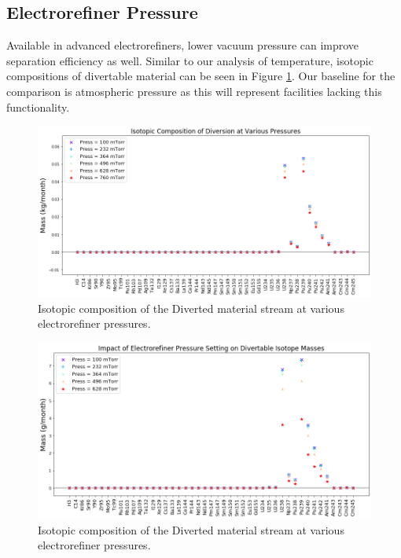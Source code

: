 \subsection{Electrorefiner Pressure}

Available in advanced electrorefiners, lower vacuum pressure can improve separation efficiency as well. Similar to our analysis of temperature, isotopic compositions of
divertable material can be seen in Figure \ref{fig:ref-press-sa}. Our baseline for the comparison is atmospheric pressure as this will represent facilities lacking this
functionality. 

\begin{figure}
	\includegraphics[width=\linewidth]{images/pressure-sa-comp}
	\caption{Isotopic composition of the Diverted material stream at various electrorefiner pressures.}
	\label{fig:ref-press-sa}
\end{figure}

\begin{figure}
	\includegraphics[width=\linewidth]{images/pressure-sa-diff}
	\caption{Isotopic composition of the Diverted material stream at various electrorefiner pressures.}
	\label{fig:ref-press-diff}
\end{figure}


